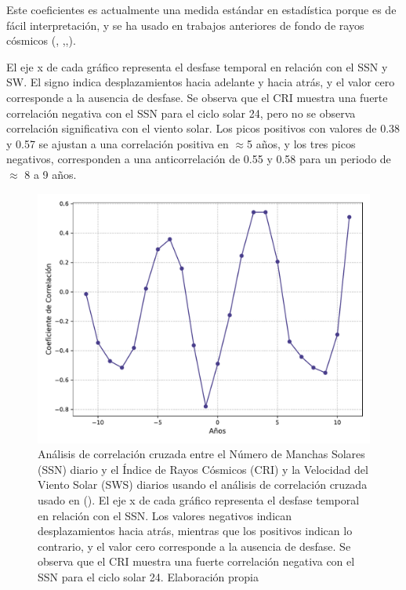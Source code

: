 Este coeficientes es actualmente una medida estándar en estadística porque es de fácil interpretación, y se ha usado en trabajos anteriores de fondo de rayos cósmicos (\cite{Usoskin_2005}, \cite{Oloketuyi_2020},\cite{Mendonça_2019},\cite{Davies_2023}).


El eje x de cada gráfico representa el desfase temporal en relación con el SSN y SW. El signo indica desplazamientos hacia adelante y hacia atrás, y el valor cero corresponde a la ausencia de desfase. Se observa que el CRI muestra una fuerte correlación negativa con el SSN para el ciclo solar 24, pero no se observa correlación significativa con el viento solar. Los picos positivos con valores de 0.38 y 0.57 se ajustan a una correlación positiva en $\approx$5 años, y los tres picos negativos, corresponden a una anticorrelación de 0.55 y 0.58 para un periodo de $\approx$ 8 a 9 años.
\begin{figure}
\centering
    \includegraphics[width=0.7\linewidth]{Figs/Figr/CRI_SN_crosscorr.pdf}
    \caption{Análisis de correlación cruzada entre el Número de Manchas Solares (SSN) diario y el Índice de Rayos Cósmicos (CRI) y la Velocidad del Viento Solar (SWS) diarios usando el análisis de correlación cruzada usado en (\cite{Oloketuyi_2020}). El eje x de cada gráfico representa el desfase temporal en relación con el SSN. Los valores negativos indican desplazamientos hacia atrás, mientras que los positivos indican lo contrario, y el valor cero corresponde a la ausencia de desfase. Se observa que el CRI muestra una fuerte correlación negativa con el SSN para el ciclo solar 24. Elaboración propia}
    \label{fig:sunspots_corr}
\end{figure}
